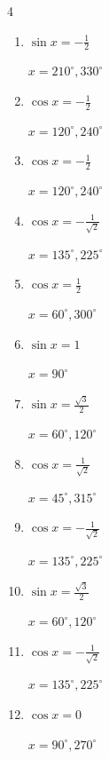 \begin{multicols}{4}
\begin{enumerate}
  \item $\displaystyle \sin{x}  = -\frac{1}{2}$

        $\displaystyle x = 210^{\circ} , 330^{\circ}$

  \item $\displaystyle \cos{x}  = -\frac{1}{2}$

        $\displaystyle x = 120^{\circ} , 240^{\circ}$

  \item $\displaystyle \cos{x}  = -\frac{1}{2}$

        $\displaystyle x = 120^{\circ} , 240^{\circ}$

  \item $\displaystyle \cos{x}  = -\frac{1}{\sqrt{2}}$

        $\displaystyle x = 135^{\circ} , 225^{\circ}$

  \item $\displaystyle \cos{x}  = \frac{1}{2}$

        $\displaystyle x = 60^{\circ} , 300^{\circ}$

  \item $\displaystyle \sin{x}  = 1$

        $\displaystyle x = 90^{\circ}$

  \item $\displaystyle \sin{x}  = \frac{\sqrt{3}}{2}$

        $\displaystyle x = 60^{\circ} , 120^{\circ}$

  \item $\displaystyle \cos{x}  = \frac{1}{\sqrt{2}}$

        $\displaystyle x = 45^{\circ} , 315^{\circ}$

  \item $\displaystyle \cos{x}  = -\frac{1}{\sqrt{2}}$

        $\displaystyle x = 135^{\circ} , 225^{\circ}$

  \item $\displaystyle \sin{x}  = \frac{\sqrt{3}}{2}$

        $\displaystyle x = 60^{\circ} , 120^{\circ}$

  \item $\displaystyle \cos{x}  = -\frac{1}{\sqrt{2}}$

        $\displaystyle x = 135^{\circ} , 225^{\circ}$

  \item $\displaystyle \cos{x}  = 0$

        $\displaystyle x = 90^{\circ} , 270^{\circ}$


\end{enumerate}
\end{multicols}
